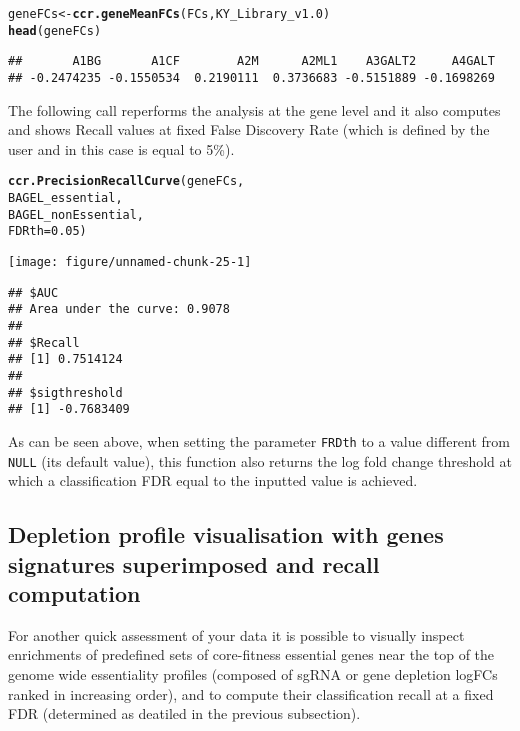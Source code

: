 \documentclass{article}\usepackage[]{graphicx}\usepackage[]{color}
\makeatletter
\def\maxwidth{ %
  \ifdim\Gin@nat@width>\linewidth
    \linewidth
  \else
    \Gin@nat@width
  \fi
}
\newcommand{\hlnum}[1]{\textcolor[rgb]{0.686,0.059,0.569}{#1}}%
\newcommand{\hlstd}[1]{\textcolor[rgb]{0.345,0.345,0.345}{#1}}%
\newcommand{\hlkwb}[1]{\textcolor[rgb]{0.69,0.353,0.396}{#1}}%
\newcommand{\hlkwc}[1]{\textcolor[rgb]{0.333,0.667,0.333}{#1}}%
\newcommand{\hlkwd}[1]{\textcolor[rgb]{0.737,0.353,0.396}{\textbf{#1}}}%
\newenvironment{kframe}{%
 \def\at@end@of@kframe{}%
 \ifinner\ifhmode%
  \def\at@end@of@kframe{\end{minipage}}%
  \begin{minipage}{\columnwidth}%
 \fi\fi%
 \def\FrameCommand##1{\hskip\@totalleftmargin \hskip-\fboxsep
 \colorbox{shadecolor}{##1}\hskip-\fboxsep
     \hskip-\linewidth \hskip-\@totalleftmargin \hskip\columnwidth}%
 \MakeFramed {\advance\hsize-\width
   \@totalleftmargin\z@ \linewidth\hsize
   \@setminipage}}%
 {\par\unskip\endMakeFramed%
 \at@end@of@kframe}
\newenvironment{knitrout}{}{} %
\makeatother
\begin{document}
\begin{knitrout}
\color{fgcolor}\begin{kframe}
\begin{alltt}
\hlstd{geneFCs}\hlkwb{<-}\hlkwd{ccr.geneMeanFCs}\hlstd{(FCs,KY_Library_v1.0)}
\hlkwd{head}\hlstd{(geneFCs)}
\end{alltt}
\begin{verbatim}
##       A1BG       A1CF        A2M      A2ML1    A3GALT2     A4GALT 
## -0.2474235 -0.1550534  0.2190111  0.3736683 -0.5151889 -0.1698269
\end{verbatim}
\end{kframe}
\end{knitrout}

The following call reperforms the analysis at the gene level and it also computes and shows Recall values at fixed False Discovery Rate (which is defined by the user and in this case is equal to 5\%).

\begin{knitrout}
\color{fgcolor}\begin{kframe}
\begin{alltt}
\hlkwd{ccr.PrecisionRecallCurve}\hlstd{(geneFCs,}
                         \hlstd{BAGEL_essential,}
                         \hlstd{BAGEL_nonEssential,}
                         \hlkwc{FDRth} \hlstd{=} \hlnum{0.05}\hlstd{)}
\end{alltt}
\end{kframe}
\texttt{[image: figure/unnamed-chunk-25-1]} 
\begin{kframe}\begin{verbatim}
## $AUC
## Area under the curve: 0.9078
## 
## $Recall
## [1] 0.7514124
## 
## $sigthreshold
## [1] -0.7683409
\end{verbatim}
\end{kframe}
\end{knitrout}
 
As can be seen above, when setting the parameter \texttt{FRDth} to a value different from \texttt{NULL}
(its default value), this function also returns the log fold change threshold at which a classification FDR equal to the inputted value is achieved. 
 
\subsection{Depletion profile visualisation with genes signatures superimposed and recall computation}
For another quick assessment of your data it is possible to visually inspect enrichments of predefined sets of core-fitness essential genes near the top of the genome wide essentiality profiles (composed of sgRNA or gene depletion logFCs ranked in increasing order), and to compute their classification recall at a fixed FDR (determined as deatiled in the previous subsection).\\
 
\end{document}
